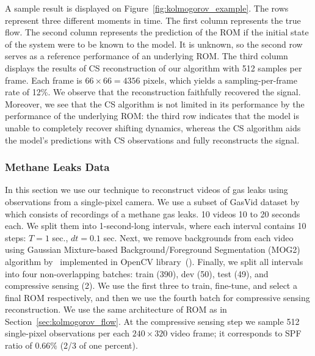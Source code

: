 A sample result is displayed on Figure~\ref{fig:kolmogorov_example}. The rows represent three different moments in time. The first column represents the true flow. The second column represents the prediction of the ROM if the initial state of the system were to be known to the model. It is unknown, so the second row serves as a reference performance of an underlying ROM. The third column displays the results of CS reconstruction of our algorithm with 512 samples per frame. Each frame is $66\times 66=4356$ pixels, which yields a sampling-per-frame rate of 12\%. We observe that the reconstruction faithfully recovered the signal. Moreover, we see that the CS algorithm is not limited in its performance by the performance of the underlying ROM: the third row indicates that the model is unable to completely recover shifting dynamics, whereas the CS algorithm aids the model's predictions with CS observations and fully reconstructs the signal.

\subsubsection{Methane Leaks Data}
In this section we use our technique to reconstruct videos of gas leaks using observations from a single-pixel camera. We use a subset of GasVid dataset by~\cite{wang2020machine} which consists of recordings of a methane gas leaks. 10 videos 10 to 20 seconds each. We split them into 1-second-long intervals, where each interval contains 10 steps: $T = 1$ sec., $dt = 0.1$ sec. Next, we remove backgrounds from each video using Gaussian Mixture-based Background/Foreground Segmentation (MOG2) algorithm by~\cite{zivkovic2006efficient,zivkovic2004improved} implemented in OpenCV library~(\cite{opencv_library}). Finally, we split all intervals into four non-overlapping batches: train (390), dev (50), test (49), and compressive sensing (2). We use the first three to train, fine-tune, and select a final ROM respectively, and then we use the fourth batch for compressive sensing reconstruction. We use the same architecture of ROM as in Section~\ref{sec:kolmogorov_flow}. At the compressive sensing step we sample 512 single-pixel observations per each $240 \times 320$ video frame; it corresponds to SPF ratio of $0.66\%$ (2/3 of one percent).

